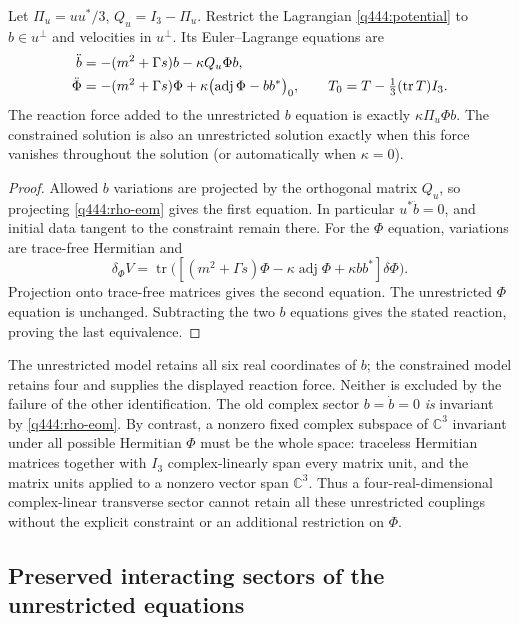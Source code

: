 \begin{proposition}\label{q444:constrained}
Let $\Pi_u=uu^*/3$, $Q_u=I_3-\Pi_u$. Restrict the Lagrangian
\eqref{q444:potential} to $b\in u^\perp$ and velocities in $u^\perp$.
Its Euler--Lagrange equations are
\begin{align}\label{q444:projected}
 \ddot b&=-(m^2+\Gamma s)b-\kappa Q_u\Phi b,\notag\\
 \ddot\Phi&=-(m^2+\Gamma s)\Phi
       +\kappa\bigl(\operatorname{adj}\Phi-bb^*\bigr)_0,
 \qquad T_0=T-\tfrac13(\operatorname{tr}T)I_3.
\end{align}
The reaction force added to the unrestricted $b$ equation is exactly
$\kappa\Pi_u\Phi b$. The constrained solution is also an unrestricted
solution exactly when this force vanishes throughout the solution
(or automatically when $\kappa=0$).
\end{proposition}
\begin{proof}
Allowed $b$ variations are projected by the orthogonal matrix $Q_u$, so
projecting \eqref{q444:rho-eom} gives the first equation. In particular
$u^*\ddot b=0$, and initial data tangent to the constraint remain there.
For the $\Phi$ equation, variations are trace-free Hermitian and
\[
 \delta_\Phi V=
 \operatorname{tr}\bigl([(m^2+\Gamma s)\Phi
              -\kappa\operatorname{adj}\Phi+\kappa bb^*]\delta\Phi\bigr).
\]
Projection onto trace-free matrices gives the second equation. The
unrestricted $\Phi$ equation is unchanged. Subtracting the two $b$
equations gives the stated reaction, proving the last equivalence.
\end{proof}

The unrestricted model retains all six real coordinates of $b$; the
constrained model retains four and supplies the displayed reaction force.
Neither is excluded by the failure of the other identification. The old
complex sector $b=\dot b=0$ \emph{is} invariant by \eqref{q444:rho-eom}.
By contrast, a nonzero fixed complex subspace of $\mathbb C^3$ invariant
under all possible Hermitian $\Phi$ must be the whole space: traceless
Hermitian matrices together with $I_3$ complex-linearly span every matrix
unit, and the matrix units applied to a nonzero vector span $\mathbb C^3$.
Thus a four-real-dimensional complex-linear transverse sector cannot retain all
these unrestricted couplings without the explicit constraint or an
additional restriction on $\Phi$.

\subsection{Preserved interacting sectors of the unrestricted equations}

